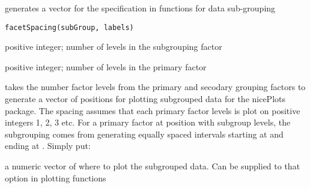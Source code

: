 \documentclass[a4paper]{book}
\begin{document}
%
\begin{Description}\relax
{} generates a vector for the  specification in functions for data sub-grouping
\end{Description}
%
\begin{Usage}
\begin{verbatim}
facetSpacing(subGroup, labels)
\end{verbatim}
\end{Usage}
%
\begin{Arguments}
\begin{ldescription}
\item[\code{subGroup}] positive integer; number of levels in the subgrouping factor

\item[\code{labels}] positive integer; number of levels in the primary factor
\end{ldescription}
\end{Arguments}
%
\begin{Details}\relax
{} takes the number factor levels from the primary and secodary grouping factors to generate a vector of positions for plotting subgrouped data for the nicePlots package.
The spacing assumes that each primary factor levels is plot on positive integers 1, 2, 3 etc.
For a primary factor at position  with  subgroup levels, the subgrouping comes from generating equally spaced intervals starting at  and ending at . Simply put: 
\end{Details}
%
\begin{Value}
a numeric vector of where to plot the subgrouped data. Can be supplied to that  option in plotting functions
\end{Value}
%
\begin{SeeAlso}\relax
{}
\end{SeeAlso}
%
\begin{Examples}
\end{Examples}
\end{document}
